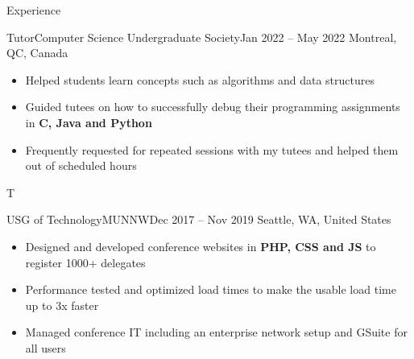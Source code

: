 \documentclass[]{mcdowellcv}
\begin{document}
\begin{cvsection}{Experience}
\begin{cvsubsection}{Tutor}{Computer Science Undergraduate Society}{Jan 2022 -- May 2022}
		\vspace{-2.5mm}
			Montreal, QC, Canada
			\begin{itemize}%
				\item Helped students learn concepts such as algorithms and data structures
				\item Guided tutees on how to successfully debug their programming assignments in \textbf{C, Java and Python}
				\item Frequently requested for repeated sessions with my tutees and helped them out of scheduled hours
			\end{itemize}
		\end{cvsubsection}
	\ifx\WEB T{
		\begin{cvsubsection}{USG of Technology}{MUNNW}{Dec 2017 -- Nov 2019}
			\vspace{-2.5mm}
				Seattle, WA, United States
				\begin{itemize}%
					\item Designed and developed conference websites in \textbf{PHP, CSS and JS} to register 1000+ delegates
					\item Performance tested and optimized load times to make the usable load time up to 3x faster
					\item Managed conference IT including an enterprise network setup and GSuite for all users
				\end{itemize}
			\end{cvsubsection}
	}  \fi
\end{cvsection}
\end{document}
